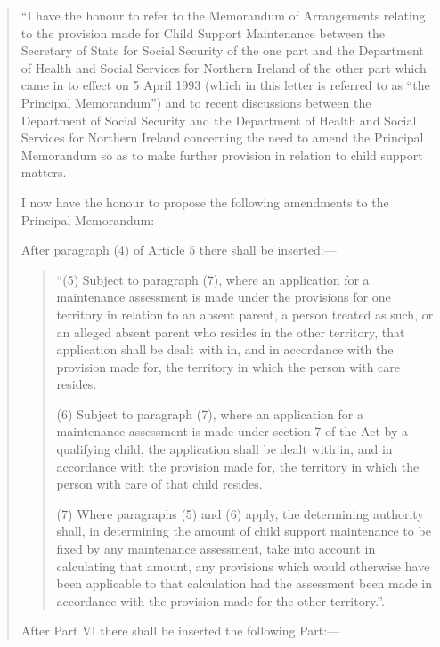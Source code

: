 \documentclass[12pt,a4paper]{article}
\begin{document}
\begin{quotation}
  “I have the honour to refer to the Memorandum of Arrangements relating to the provision made for Child Support Maintenance between the Secretary of State for Social Security of the one part and the Department of Health and Social Services for Northern Ireland of the other part which came in to effect on 5 April 1993 (which in this letter is referred to as “the Principal Memorandum”) and to recent discussions between the Department of Social Security and the Department of Health and Social Services for Northern Ireland concerning the need to amend the Principal Memorandum so as to make further provision in relation to child support matters.

\begin{sloppypar}
  I now have the honour to propose the following amendments to the Principal Memorandum:
\end{sloppypar}

\begin{sloppypar}
  After paragraph (4) of Article 5 there shall be inserted:—
\end{sloppypar}
\begin{quotation}
 “(5) Subject to paragraph (7), where an application for a maintenance assessment is made under the provisions for one territory in relation to an absent parent, a person treated as such, or an alleged absent parent who resides in the other territory, that application shall be dealt with in, and in accordance with the provision made for, the territory in which the person with care resides.

(6) Subject to paragraph (7), where an application for a maintenance assessment is made under section 7 of the Act by a qualifying child, the application shall be dealt with in, and in accordance with the provision made for, the territory in which the person with care of that child resides.

\begin{sloppypar}
(7) Where paragraphs (5) and (6) apply, the determining authority shall, in determining the amount of child support maintenance to be fixed by any maintenance assessment, take into account in calculating that amount, any provisions which would otherwise have been applicable to that calculation had the assessment been made in accordance with the provision made for the other territory.”.
\end{sloppypar}
\end{quotation}

  After Part VI there shall be inserted the following Part:—
\begin{quotation}

\end{quotation}
\end{quotation}
\end{document}
